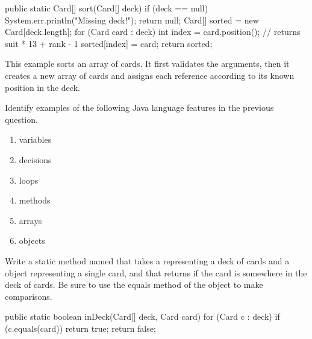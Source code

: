 \begin{javalst}
public static Card[] sort(Card[] deck) {
    if (deck == null) {
        System.err.println("Missing deck!");
        return null;
    }
    Card[] sorted = new Card[deck.length];
    for (Card card : deck) {
        int index = card.position();       // returns suit * 13 + rank - 1
        sorted[index] = card;
    }
    return sorted;
}
\end{javalst}

\begin{answer}[5em]
This example sorts an array of cards.
It first validates the arguments, then it creates a new array of cards and assigns each  reference according to its known position in the deck.
\end{answer}


\Q Identify examples of the following Java language features in the previous question.
\begin{enumerate}
\item variables 
\item decisions 
\item loops 
\item methods 
\item arrays 
\item objects 
\end{enumerate}



\Q \label{search}
Write a static method named  that takes a  representing a deck of cards and a  object representing a single card, and that returns  if the card is somewhere in the deck of cards. Be sure to use the equals method of the  object to make comparisons.

\vspace{-1ex}
\begin{answer}[11em]
\begin{javaans}
public static boolean inDeck(Card[] deck, Card card) {
    for (Card c : deck) {
        if (c.equals(card)) {
            return true;
        }
    }
    return false;
}
\end{javaans}
\end{answer}
